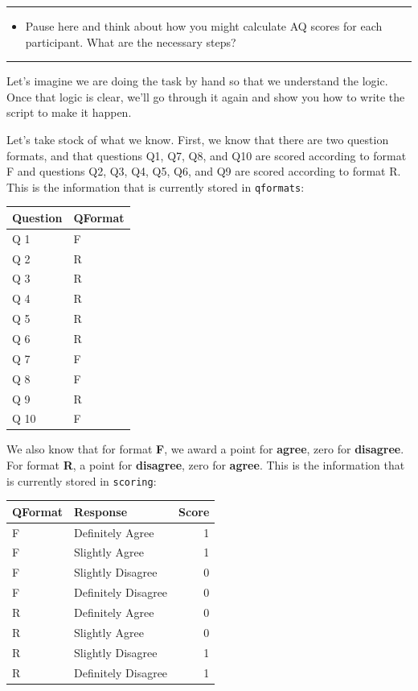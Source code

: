 \documentclass[
  oneside]{book}
\providecommand{\tightlist}{%
  \setlength{\itemsep}{0pt}\setlength{\parskip}{0pt}}
\begin{document}
\begin{center}\rule{0.5\linewidth}{0.5pt}\end{center}

\begin{itemize}
\tightlist
\item
  Pause here and think about how you might calculate AQ scores for each participant. What are the necessary steps?
\end{itemize}

\begin{center}\rule{0.5\linewidth}{0.5pt}\end{center}

Let's imagine we are doing the task by hand so that we understand the logic. Once that logic is clear, we'll go through it again and show you how to write the script to make it happen.

Let's take stock of what we know. First, we know that there are two question formats, and that questions Q1, Q7, Q8, and Q10 are scored according to format F and questions Q2, Q3, Q4, Q5, Q6, and Q9 are scored according to format R. This is the information that is currently stored in \texttt{qformats}:

\begin{tabular}{l|l}
\hline
Question & QFormat\\
\hline
Q 1 & F\\
\hline
Q 2 & R\\
\hline
Q 3 & R\\
\hline
Q 4 & R\\
\hline
Q 5 & R\\
\hline
Q 6 & R\\
\hline
Q 7 & F\\
\hline
Q 8 & F\\
\hline
Q 9 & R\\
\hline
Q 10 & F\\
\hline
\end{tabular}

We also know that for format \textbf{F}, we award a point for \textbf{agree}, zero for \textbf{disagree}. For format \textbf{R}, a point for \textbf{disagree}, zero for \textbf{agree}. This is the information that is currently stored in \texttt{scoring}:

\begin{tabular}{l|l|r}
\hline
QFormat & Response & Score\\
\hline
F & Definitely Agree & 1\\
\hline
F & Slightly Agree & 1\\
\hline
F & Slightly Disagree & 0\\
\hline
F & Definitely Disagree & 0\\
\hline
R & Definitely Agree & 0\\
\hline
R & Slightly Agree & 0\\
\hline
R & Slightly Disagree & 1\\
\hline
R & Definitely Disagree & 1\\
\hline
\end{tabular}
\end{document}
